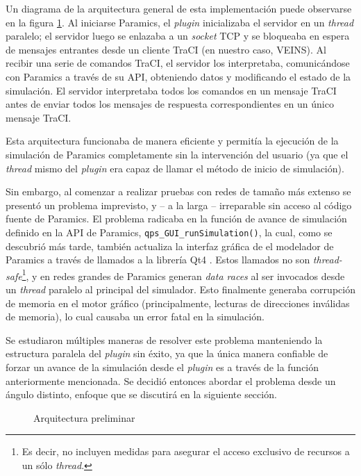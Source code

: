 Un diagrama de la arquitectura general de esta implementación puede observarse en la figura \ref{fig:ptraci_arch}. Al iniciarse Paramics, el \emph{plugin} inicializaba el servidor en un \emph{thread} paralelo; el servidor luego se enlazaba a un \emph{socket} TCP y se bloqueaba en espera de mensajes entrantes desde un cliente TraCI (en nuestro caso, VEINS). Al recibir una serie de comandos TraCI, el servidor los interpretaba, comunicándose con Paramics a través de su API, obteniendo datos y modificando el estado de la simulación. El servidor interpretaba todos los comandos en un mensaje TraCI antes de enviar todos los mensajes de respuesta correspondientes en un único mensaje TraCI.

Esta arquitectura funcionaba de manera eficiente y permitía la ejecución de la simulación de Paramics completamente sin la intervención del usuario (ya que el \emph{thread} mismo del \emph{plugin} era capaz de llamar el método de inicio de simulación). 

Sin embargo, al comenzar a realizar pruebas con redes de tamaño más extenso se presentó un problema imprevisto, y -- a la larga -- irreparable sin acceso al código fuente de Paramics. El problema radicaba en la función de avance de simulación definido en la API de Paramics, \texttt{qps\_GUI\_runSimulation()}, la cual, como se descubrió más tarde, también actualiza la interfaz gráfica de el modelador de Paramics a través de llamados a la librería Qt4 \cite{qt}. Estos llamados no son \emph{thread-safe}\footnote{Es decir, no incluyen medidas para asegurar el acceso exclusivo de recursos a un sólo \emph{thread}.}, y en redes grandes de Paramics generan \emph{data races} al ser invocados desde un \emph{thread} paralelo al principal del simulador. Esto finalmente generaba corrupción de memoria en el motor gráfico (principalmente, lecturas de direcciones inválidas de memoria), lo cual causaba un error fatal en la simulación.

Se estudiaron múltiples maneras de resolver este problema manteniendo la estructura paralela del \emph{plugin} sin éxito, ya que la única manera confiable de forzar un avance de la simulación desde el \emph{plugin} es a través de la función anteriormente mencionada. Se decidió entonces abordar el problema desde un ángulo distinto, enfoque que se discutirá en la siguiente sección.

\begin{figure}[]
    \centering
    
    \caption{Arquitectura preliminar}
    \label{fig:ptraci_arch}
\end{figure}

